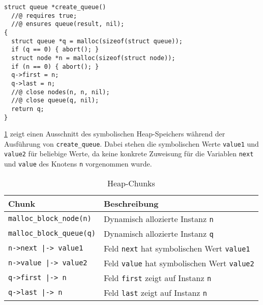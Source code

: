 \begin{lstlisting}
struct queue *create_queue()
  //@ requires true;
  //@ ensures queue(result, nil);
{
  struct queue *q = malloc(sizeof(struct queue));
  if (q == 0) { abort(); }
  struct node *n = malloc(sizeof(struct node));
  if (n == 0) { abort(); }
  q->first = n;
  q->last = n;
  //@ close nodes(n, n, nil);
  //@ close queue(q, nil);
  return q;
}
\end{lstlisting}

\noindent
\cref{tab:heap-chunks} zeigt einen Ausschnitt des symbolischen Heap-Speichers während der Ausführung von \texttt{create\_queue}. Dabei stehen die symbolischen Werte \texttt{value1} und \texttt{value2} für beliebige Werte, da keine konkrete Zuweisung für die Variablen \texttt{next} und \texttt{value} des Knotens \texttt{n} vorgenommen wurde.

{\setlength\extrarowheight{3pt} %
\begin{table}[hbt!]
	\caption{Heap-Chunks}
	\begin{tabularx}{\textwidth}{|p{4.5cm}|X|}
		\hline
		\rowcolor{LightGrey1}
		\textbf{Chunk}                   & \textbf{Beschreibung}                                     \\ \hline
		\texttt{malloc\_block\_node(n)}  & Dynamisch allozierte Instanz \texttt{n}                   \\ \hline
		\texttt{malloc\_block\_queue(q)} & Dynamisch allozierte Instanz \texttt{q}                   \\ \hline
		\texttt{n->next |-> value1}      & Feld \texttt{next} hat symbolischen Wert \texttt{value1}  \\ \hline
		\texttt{n->value |-> value2}     & Feld \texttt{value} hat symbolischen Wert \texttt{value2} \\ \hline
		\texttt{q->first |-> n}          & Feld \texttt{first} zeigt auf Instanz \texttt{n}          \\ \hline
		\texttt{q->last |-> n}           & Feld \texttt{last} zeigt auf Instanz \texttt{n}           \\ \hline
	\end{tabularx}
	\label{tab:heap-chunks}
\end{table}
}

